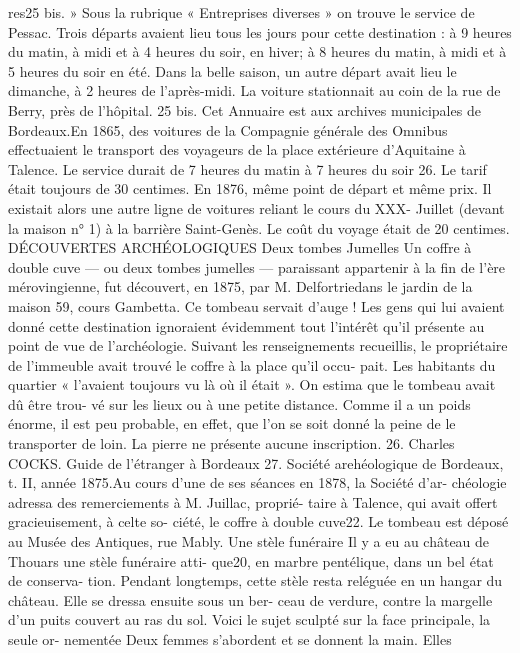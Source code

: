 \documentclass[a4paper,11pt]{book}
\begin{document}
res25 bis. »
Sous la rubrique « Entreprises diverses » on trouve le
service de Pessac. Trois départs avaient lieu tous les jours
pour cette destination : à 9 heures du matin, à midi et à
4 heures du soir, en hiver; à 8 heures du matin, à midi
et à 5 heures du soir en été. Dans la belle saison, un autre
départ avait lieu le dimanche, à 2 heures de l'après-midi.
La voiture stationnait au coin de la rue de Berry, près
de l'hôpital.
25 bis. Cet Annuaire est aux archives municipales de Bordeaux.En 1865, des voitures de la Compagnie générale des
Omnibus effectuaient le transport des voyageurs de la
place extérieure d'Aquitaine à Talence. Le service durait
de 7 heures du matin à 7 heures du soir 26. Le tarif était
toujours de 30 centimes.
En 1876, même point de départ et même prix. Il existait
alors une autre ligne de voitures reliant le cours du XXX-
Juillet (devant la maison n° 1) à la barrière Saint-Genès.
Le coût du voyage était de 20 centimes.
DÉCOUVERTES ARCHÉOLOGIQUES
Deux tombes Jumelles
Un coffre à double cuve — ou deux tombes jumelles —
paraissant appartenir à la fin de l'ère mérovingienne, fut
découvert, en 1875, par M. Delfortriedans le jardin de
la maison 59, cours Gambetta. Ce tombeau servait d'auge !
Les gens qui lui avaient donné cette destination ignoraient
évidemment tout l'intérêt qu'il présente au point de vue
de l'archéologie.
Suivant les renseignements recueillis, le propriétaire
de l'immeuble avait trouvé le coffre à la place qu'il occu-
pait. Les habitants du quartier « l'avaient toujours vu là
où il était ». On estima que le tombeau avait dû être trou-
vé sur les lieux ou à une petite distance. Comme il a un
poids énorme, il est peu probable, en effet, que l'on se
soit donné la peine de le transporter de loin. La pierre ne
présente aucune inscription.
26. Charles COCKS. Guide de l'étranger à Bordeaux
27. Société arehéologique de Bordeaux, t. II, année 1875.Au cours d'une de ses séances en 1878, la Société d'ar-
chéologie adressa des remerciements à M. Juillac, proprié-
taire à Talence, qui avait offert gracieuisement, à celte so-
ciété, le coffre à double cuve22.
Le tombeau est déposé au Musée des Antiques, rue
Mably.
Une stèle funéraire
Il y a eu au château de Thouars une stèle funéraire atti-
que20, en marbre pentélique, dans un bel état de conserva-
tion. Pendant longtemps, cette stèle resta reléguée en un
hangar du château. Elle se dressa ensuite sous un ber-
ceau de verdure, contre la margelle d'un puits couvert au
ras du sol.
Voici le sujet sculpté sur la face principale, la seule or-
nementée
Deux femmes s'abordent et se donnent la main. Elles
\end{document}
